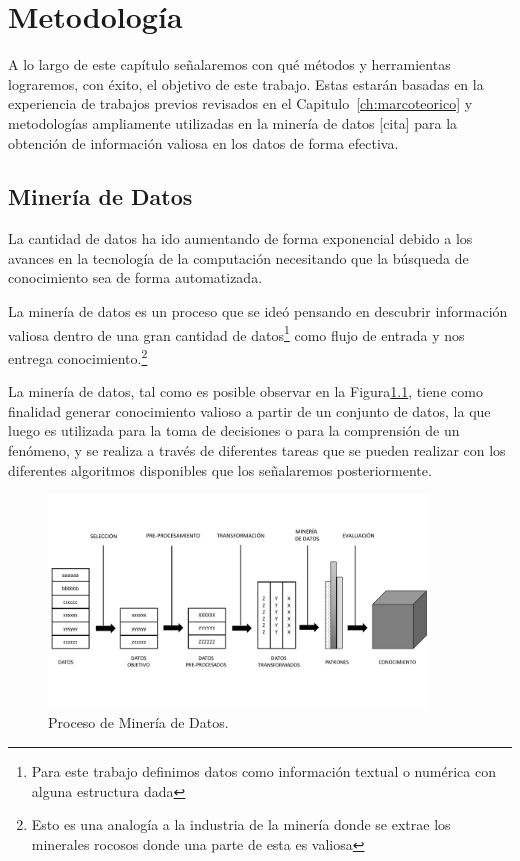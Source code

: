 \chapter{Metodología}
\label{ch:metodologia}

A lo largo de este capítulo señalaremos con qué métodos y herramientas lograremos, con éxito, el objetivo de este trabajo. Estas estarán basadas en la experiencia de trabajos previos revisados en el Capitulo~\ref{ch:marcoteorico} y metodologías ampliamente utilizadas en la minería de datos [cita] para la obtención de información valiosa en los datos de forma efectiva.

\section{Minería de Datos}
La cantidad de datos ha ido aumentando de forma exponencial debido a los avances en la tecnología de la computación necesitando que la búsqueda de conocimiento sea de forma automatizada.

La minería de datos es un proceso que se ideó pensando en descubrir información valiosa dentro de una gran cantidad de datos\footnote{Para este trabajo definimos datos como información textual o numérica con alguna estructura dada} como flujo de entrada y nos entrega conocimiento.\footnote{Esto es una analogía a la industria de la minería donde se extrae los minerales rocosos donde una parte de esta es valiosa}

La minería de datos, tal como es posible observar en la Figura\ref{fig:datamining}, tiene como finalidad generar conocimiento  valioso a partir de un conjunto de datos, la que luego es utilizada para la toma de decisiones o para la comprensión de un fenómeno, y se realiza a través de diferentes tareas que se pueden realizar con los diferentes algoritmos disponibles que los señalaremos posteriormente.

\begin{figure}[H]
  \centering
    \includegraphics[width=0.9\textwidth]{Figuras/DM}
      \caption{Proceso de Minería de Datos.}
    \label{fig:datamining}
\end{figure}

